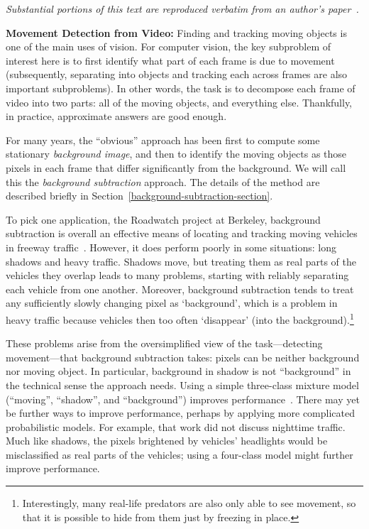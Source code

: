 \newcommand{\secref}[1]{Section~\ref{#1}}
\newcommand{\figref}[1]{Figure~\ref{#1}}
\newcommand{\tabref}[1]{Table~\ref{#1}}
\newcommand{\eqref}[1]{Equation~(\ref{#1})}

\newcommand{\mbf}[1]{\mbox{{\bf #1}}}
\newcommand{\smbf}[1]{\mbox{{\scriptsize\bf #1}}}
\def\w{\mbf{w}}

{\centering\scriptsize\em
  Substantial portions of this text are reproduced verbatim from an
  author's paper~\cite{friedman:1997:uai}.}
    
{\bf Movement Detection from Video:} Finding and tracking moving
objects is one of the main uses of vision.  For computer vision, the key
subproblem of interest here is to first identify what part of each
frame is due to movement (subsequently, separating into objects and
tracking each across frames are also important subproblems).  In other
words, the task is to decompose 
each frame of video into two parts: all of the moving objects, and
everything else.  Thankfully, in practice, approximate answers are
good enough.

For many years, the ``obvious'' approach has
been first to compute some stationary {\em background image}, and then to
identify the moving objects as those pixels in each frame that
differ significantly from the background. We will call this the
{\em background subtraction} approach. 
The details of the method are described briefly in
\secref{background-subtraction-section}.

To pick one application, the Roadwatch project at Berkeley,
background subtraction is overall an effective means of
locating and tracking moving vehicles in freeway
traffic~\cite{Koller+al:1994}.  However, it does perform poorly in
some situations: long shadows and heavy traffic. 
Shadows move, but treating them as real parts of the vehicles they
overlap leads to many problems, starting with reliably separating each
vehicle from one another.
Moreover, background subtraction tends to treat any
sufficiently slowly changing pixel as 
`background', which is a problem in heavy traffic because vehicles
then too often `disappear' (into the background).\footnote{Interestingly,
  many real-life predators are also only able to see movement, so that
  it is possible to hide from them just by freezing in place.}

These problems arise from the oversimplified view of the
task---detecting movement---that
background subtraction takes: pixels can be neither background nor
moving object.  In particular, background in shadow is not
``background'' in the technical sense the approach needs.
Using a simple three-class mixture model (``moving'', ``shadow'', and
``background'') improves performance~\cite{friedman97uai}.  There may
yet be further ways to improve performance, perhaps by applying more
complicated probabilistic models.  For example, that work did not
discuss nighttime traffic.  Much like shadows, the pixels brightened
by vehicles' headlights would be misclassified as real parts of the
vehicles; using a four-class model might further improve performance.



